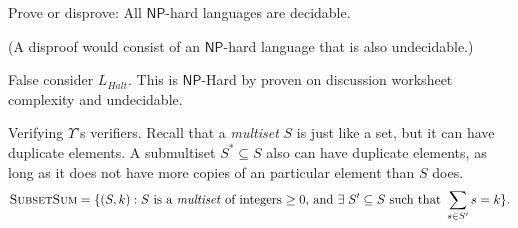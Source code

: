 \documentclass[12pt, letterpaper]{article}
\newcommand{\NP}{\mathsf{NP}}
\begin{document}
\begin{subproblem}{}
    Prove or disprove: All $\NP$-hard languages are decidable. 

    (A disproof would consist of an $\NP$-hard language that is also undecidable.) 
\end{subproblem}
\begin{problemproof}
    False consider $L_{Halt}$. This is $\NP$-Hard by proven on discussion worksheet complexity and undecidable.
\end{problemproof}
\newcommand{\SubsetSum}{\textsc{SubsetSum}}
\begin{problem}{Verifying $\Upsilon$'s verifiers.}
    Recall that a \emph{multiset} $S$ is just like a set, but it can have duplicate elements. A submultiset $S^* \subseteq S$ also can have duplicate elements, as long as it does not have more copies of an particular element than $S$ does. 
    \[ 
        \SubsetSum = \{(S, k) : S \text{ is a \emph{multiset} of integers $\geq 0$, and } \exists\; S' \subseteq S \text{ such that } \sum_{s \in S'} s = k\}.
    \]
\end{problem}
\end{document}
